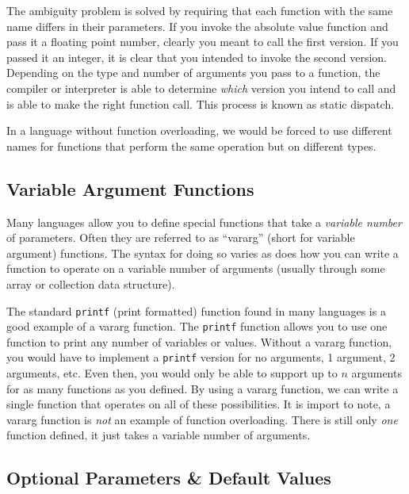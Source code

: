 The ambiguity problem is solved by requiring that each function with the
same name differs in their parameters.  If you invoke the absolute
value function and pass it a floating point number, clearly you meant 
to call the first version.  If you passed it an integer, it is clear that you
intended to invoke the second version.  Depending on the type and
number of arguments you pass to a function, the compiler or 
interpreter is able to determine \emph{which} version you intend
to call and is able to make the right function call.  This process is
known as \gls{static dispatch}.

In a language without function overloading, we would be forced to
use different names for functions that perform the same operation
but on different types.  

\subsection{Variable Argument Functions}

Many languages allow you to define special functions that take
a \emph{variable number} of parameters.  Often they are referred
to as ``vararg'' (short for variable argument) functions.  The syntax
for doing so varies as does how you can write a function to operate
on a variable number of arguments (usually through some array or
collection data structure).

The standard \texttt{printf} (print formatted) function found
in many languages is a good example of a vararg function.  The
\texttt{printf} function allows you to use one function to
print any number of variables or values.  Without a vararg function,
you would have to implement a \texttt{printf} version for
no arguments, 1 argument, 2 arguments, etc.  Even then, you
would only be able to support up to $n$ arguments for as many 
functions as you defined.  By using a vararg function, we can write
a single function that operates on all of these possibilities.  It
is import to note, a vararg function is \emph{not} an example of
function overloading.  There is still only \emph{one} function defined, 
it just takes a variable number of arguments.

\subsection{Optional Parameters \& Default Values}
\label{subsection:optionalParameters}

